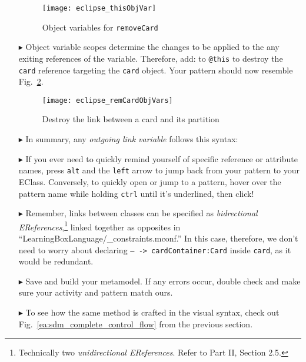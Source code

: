 \begin{itemize}
\begin{figure}[htp]
\begin{center}
  \texttt{[image: eclipse\_thisObjVar]}
  \caption{Object variables for \texttt{removeCard}}
  \label{eclipse:remCardObjVar}
\end{center}
\end{figure}

\item[$\blacktriangleright$] Object variable scopes determine the changes to be applied to the any exiting references of the variable. Therefore, add:
 to \texttt{@this} to destroy the \texttt{card} reference targeting the \texttt{card} object. Your pattern should now resemble
Fig.~\ref{eclipse:deleteReference}. 

\begin{figure}[htp]
\begin{center}
    \texttt{[image: eclipse\_remCardObjVars]}
  \caption{Destroy the link between a card and its partition}
  \label{eclipse:deleteReference}
\end{center}
\end{figure}
\newpage

\item[$\blacktriangleright$] In summary, any \emph{outgoing link variable} follows this syntax:


\item[$\blacktriangleright$] If you ever need to quickly remind yourself of specific reference or attribute names, press \texttt{alt} and the \texttt{left}
arrow to jump back from your pattern to your EClass. Conversely, to quickly open or jump to a pattern, hover over the pattern name while holding \texttt{ctrl}
until it's underlined, then click!

\item[$\blacktriangleright$] Remember, links between classes can be specified as \emph{bidrectional EReferences},\footnote{Technically two
\emph{unidirectional EReferences}. Refer to Part II, Section 2.5.} linked together as opposites in ``LearningBoxLanguage/\_con\-straints.mconf.'' In this case,
therefore, we don't need to worry about declaring \texttt{-- -> cardContainer:Card} inside \texttt{card}, as it would be redundant.

\item[$\blacktriangleright$] Save and build your metamodel. If any errors occur, double check and make sure your activity and pattern match ours. 

\item[$\blacktriangleright$] To see how the same method is crafted in the visual syntax, check out Fig.~\ref{ea:sdm_complete_control_flow} from the previous
section.

\end{itemize}
